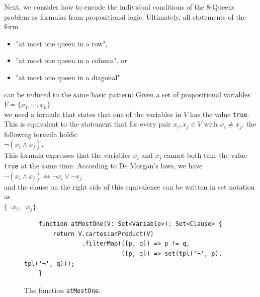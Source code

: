 Next, we consider how to encode the individual conditions of the 8-Queens problem as formulas from
propositional logic. Ultimately, all statements of the form 
\begin{itemize}
\item "at most one queen in a row",
\item "at most one queen in a column", or
\item "at most one queen in a diagonal"
\end{itemize}
can be reduced to the same basic pattern:
Given a set of propositional variables \\[0.2cm]
\hspace*{1.3cm} $V = \{ x_1, \cdots, x_n \}$ \\[0.2cm]
we need a formula that states that  one of the variables in
$V$ has the value \texttt{true}. This is equivalent to the statement that for every pair
$x_i, x_j \in V$ with $x_i \neq x_j$, the following formula holds: \\[0.2cm]
\hspace*{1.3cm} $\neg (x_i \wedge x_j)$. \\[0.2cm]
This formula expresses that the variables $x_i$ and $x_j$ cannot both take the value
\texttt{true} at the same time. According to De Morgan's laws, we have
\\[0.2cm]
\hspace*{1.3cm}
$\neg (x_i \wedge x_j) \Leftrightarrow \neg x_i \vee \neg x_j$
\\[0.2cm]
and the clause on the right side of this equivalence can be written in set notation as
\\[0.2cm]
\hspace*{1.3cm}  $\{\neg x_i, \neg x_j \}$. 

\begin{figure}[!ht]
  \centering
\begin{verbatim}
    function atMostOne(V: Set<Variable>): Set<Clause> {
        return V.cartesianProduct(V)
                .filterMap(([p, q]) => p != q,
                           ([p, q]) => set(tpl('¬', p), tpl('¬', q)));
    }
\end{verbatim}
\vspace*{-0.3cm}
  \caption{The function \texttt{atMostOne}.}
  \label{fig:atMostOne}
\end{figure}

